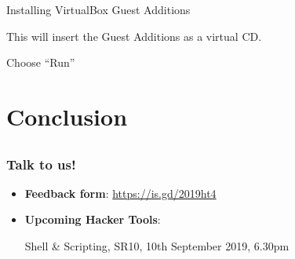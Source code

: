 \documentclass[12pt]{beamer}
\begin{document}
\begin{frame}{Installing VirtualBox Guest Additions}

  This will insert the Guest Additions as a virtual CD.

  Choose ``Run''
\end{frame}

\section{Conclusion}
\subsection{}
\begin{frame}
  \frametitle{Talk to us!}
  \begin{itemize}
    \item \textbf{Feedback form}: \url{https://is.gd/2019ht4}
    \item \textbf{Upcoming Hacker Tools}:

          Shell \& Scripting, SR10, 10th September 2019, 6.30pm
  \end{itemize}
\end{frame}
\end{document}
